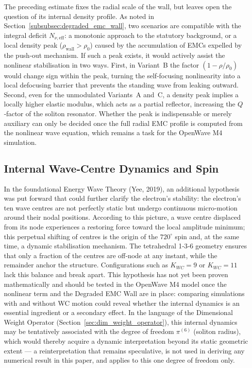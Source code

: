 \documentclass[10pt,a4paper]{article}
\begin{document}
The preceding estimate fixes the radial scale of the wall, but leaves open
the question of its internal density profile.  As noted in
Section~\ref{subsubsec:degraded_emc_wall}, two scenarios are compatible with
the integral deficit $N_{\nu,\text{eff}}$: a monotonic approach to the
statutory background, or a local density peak ($\rho_{\text{wall}} >
\rho_{0}$) caused by the accumulation of EMCs expelled by the push‑out
mechanism.  If such a peak exists, it would actively assist the nonlinear
stabilisation in two ways.  First, in Variant~B the factor
$(1-\rho/\rho_{0})$ would change sign within the peak, turning the
self‑focusing nonlinearity into a local defocusing barrier that prevents the
standing wave from leaking outward.  Second, even for the unmodulated
Variants~A and~C, a density peak implies a locally higher elastic modulus,
which acts as a partial reflector, increasing the $Q$‑factor of the soliton
resonator.  Whether the peak is indispensable or merely auxiliary can only
be decided once the full radial EMC profile is computed from the nonlinear
wave equation, which remains a task for the OpenWave M4 simulation.

\subsection*{Internal Wave‑Centre Dynamics and Spin}

In the foundational Energy Wave Theory (Yee, 2019), an additional
hypothesis was put forward that could further clarify the electron's
stability: the electron's ten wave centres are not perfectly static but
undergo continuous micro‑motion around their nodal positions.  According
to this picture, a wave centre displaced from its node experiences a
restoring force toward the local amplitude minimum; this perpetual
shifting of centres is the origin of the $720^{\circ}$ spin and, at the
same time, a dynamic stabilisation mechanism.  The tetrahedral 1‑3‑6
geometry ensures that only a fraction of the centres are off‑node at any
instant, while the remainder anchor the structure.  Configurations such
as $K_{WC}=9$ or $K_{WC}=11$ lack this balance and break apart.  This hypothesis
has not yet been proven mathematically and should be tested in the
OpenWave M4 model once the nonlinear term and the Degraded EMC Wall are
in place: comparing simulations with and without WC motion could reveal
whether the internal dynamics is an essential ingredient or a secondary
effect. In the language of the Dimensional Weight Operator
(Section~\ref{sec:dim_weight_operator}), this internal dynamics may
be tentatively associated with the degree of freedom $\pi^{(6)}$
(soliton radius), which would thereby acquire a dynamic
interpretation beyond its static geometric extent --- a
reinterpretation that remains speculative, is not used in deriving
any numerical result in this paper, and applies to this one degree
of freedom only.
\end{document}
